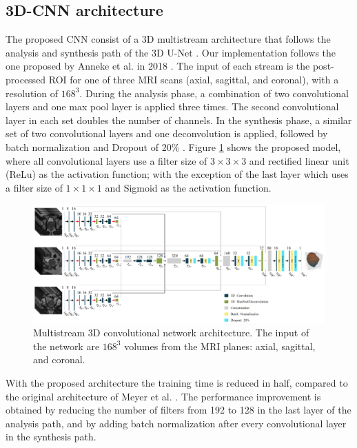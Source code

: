 \subsection{3D-CNN architecture}
The proposed CNN consist of a 3D multistream architecture that follows the analysis and synthesis path of the 3D U-Net \parencite{cciccek20163d}. Our implementation follows the one proposed by Anneke et al. in 2018  \parencite{anneke}. The input of each stream is the post-processed ROI for one of three MRI scans (axial, sagittal, and coronal), with a resolution of $168^3$. During the analysis phase, a combination of two convolutional layers and one max pool layer is applied three times. The second convolutional layer in each set doubles the number of channels.  In the synthesis phase, a similar set of two convolutional layers and one deconvolution is applied, followed by batch normalization and Dropout of 20\% \parencite{hinton2012improving}.
Figure \ref{fig:nn} shows the proposed model, where all convolutional layers use a filter size of $3 \times 3 \times 3$ and rectified linear unit (ReLu) as the activation function; with the exception of the last layer which uses a filter size of $1 \times 1 \times 1$  and Sigmoid as the activation function. 
\begin{figure}[h]
    \centering
    \includegraphics[totalheight=.275\textheight]{imgs/methodology/NN.png}
    \caption{Multistream 3D convolutional network architecture. The input of the network are $168^3$ volumes from the MRI planes: axial, sagittal, and coronal. }
    \label{fig:nn}
\end{figure}

With the proposed architecture the training time is reduced in half, compared to the original architecture of Meyer et al. \parencite{anneke}. The performance improvement is obtained by reducing the number of filters from 192 to 128 in the last layer of the analysis path, and by adding batch normalization after every convolutional layer in the synthesis path.

